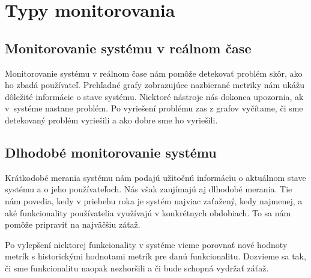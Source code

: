 \documentclass[a4paper, upjsfrontpage, disablespecwarning, thesismargins, thesislinespacing]{rnthesis}
\begin{document}
\chapter{Typy monitorovania}


\section{Monitorovanie systému v reálnom čase}

Monitorovanie systému v reálnom čase nám pomôže detekovať problém skôr, ako ho zbadá používateľ.
Prehľadné grafy zobrazujúce nazbierané metriky nám ukážu dôležité informácie o stave systému.
Niektoré nástroje nás dokonca upozornia, ak v~systéme nastane problém.
Po vyriešení problému zas z grafov vyčítame, či sme detekovaný problém vyriešili a ako dobre sme ho vyriešili.


\section{Dlhodobé monitorovanie systému}

Krátkodobé merania systému nám podajú užitočnú informáciu o aktuálnom stave systému a o jeho používateľoch.
Nás však zaujímajú aj dlhodobé merania.
Tie nám povedia, kedy v priebehu roka je systém najviac zaťažený, kedy najmenej, a aké funkcionality používatelia využívajú v konkrétnych obdobiach.
To sa nám pomôže pripraviť na najväčšiu záťaž.

Po vylepšení niektorej funkcionality v systéme vieme porovnať nové hodnoty metrík s historickými hodnotami metrík pre danú funkcionalitu.
Dozvieme sa tak, či sme funkcionalitu naopak nezhoršili a či bude schopná vydržať záťaž.
\end{document}
